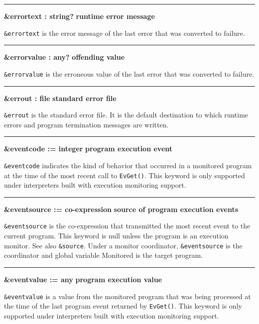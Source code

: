 \bigskip\hrule\vspace{0.1cm}
\noindent
{\bf \&errortext : string? } \hfill {\bf runtime error message}

\noindent
{}\texttt{\&errortext} is the error
message of the last error that was converted to failure.

\bigskip\hrule\vspace{0.1cm}
\noindent
{\bf \&errorvalue : any? } \hfill {\bf offending value}

\noindent
\texttt{\&errorvalue} is the erroneous value of the last error that was
converted to failure.

\bigskip\hrule\vspace{0.1cm}
\noindent
{\bf \&errout : file } \hfill {\bf standard error file}

\noindent
{}\texttt{\&errout} is the standard
error file. It is the default destination to which runtime errors and
program termination messages are written.

\bigskip\hrule\vspace{0.1cm}
\noindent
{\bf \&eventcode := integer } \hfill {\bf program execution event}

\noindent
{}\texttt{\&eventcode} indicates the
kind of behavior that occurred in a monitored program at the time of
the most recent call to \texttt{EvGet()}. This keyword is only
supported under interpreters built with execution monitoring support.

\bigskip\hrule\vspace{0.1cm}
\noindent
{\bf \&eventsource := co{}-expression } \hfill {\bf source of program execution events}

\noindent
\texttt{\&eventsource} is the co-expression that transmitted the most
recent event to the current program. This keyword is null unless the
program is an execution monitor. See also \texttt{\&source}. Under a
monitor coordinator, \texttt{\&eventsource} is the coordinator and
global variable Monitored is the target program.

\bigskip\hrule\vspace{0.1cm}
\noindent
{\bf \&eventvalue := any } \hfill {\bf program execution value}

\noindent
{}\texttt{\&eventvalue} is a value
from the monitored program that was being processed at the time of the
last program event returned by \texttt{EvGet()}. This keyword is only
supported under interpreters built with execution monitoring support.

